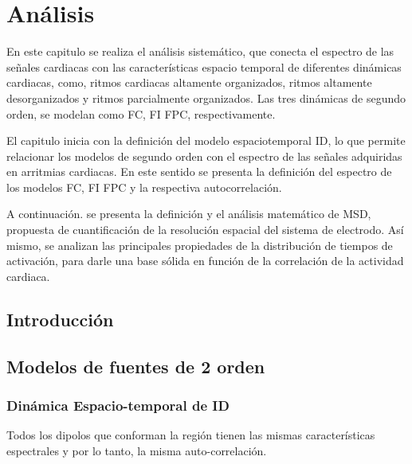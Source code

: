 
\chapter{Análisis}

\begin{resumen}

En este capitulo se realiza el análisis sistemático,  que conecta el espectro de las señales cardiacas con las características espacio temporal de diferentes dinámicas cardiacas, como, ritmos cardiacas altamente organizados, ritmos altamente desorganizados y ritmos parcialmente organizados. Las tres dinámicas de segundo orden,  se modelan  como \acf{FC}, \acf{FI} \acf{FPC}, respectivamente.

El capitulo inicia con la definición  del modelo espaciotemporal \acf{ID}, lo que permite relacionar los modelos de segundo orden con el espectro de las señales adquiridas en arritmias cardiacas. En este sentido se presenta la definición del  espectro de los modelos \ac{FC}, \ac{FI} \ac{FPC} y la respectiva autocorrelación.

A continuación. se presenta la definición y el análisis matemático  de \acf{MSD}, propuesta de  cuantificación de la resolución espacial del sistema de electrodo. Así mismo, se analizan las principales propiedades de la distribución de tiempos de activación, para darle una base sólida en función de la correlación de la  actividad cardiaca.
  


\end{resumen}

\section{Introducción}
\section{Modelos de fuentes de 2 orden}



\subsection{Dinámica Espacio-temporal de \acf{ID}}

Todos los dipolos que conforman la región tienen las mismas características espectrales  y por lo tanto, la misma auto-correlación.   

